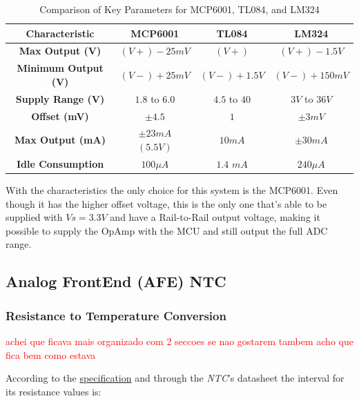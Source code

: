 \documentclass[12pt]{article}
\begin{document}
    \begin{table}[h]
        \centering
        \begin{tabular}{|c|c|c|c|}
        \hline
        \textbf{Characteristic}         & \textbf{MCP6001}      & \textbf{TL084}   & \textbf{LM324}  \\ \hline
        \textbf{Max Output (V)}         &$(V+)-25mV$            & $(V+)$           & $(V+) - 1.5V$   \\ \hline
        \textbf{Minimum Output (V)}     &$(V-)+25mV$            & $(V-) + 1.5V$   & $(V-) + 150mV$  \\ \hline
        \textbf{Supply Range (V)}       & $1.8$ to $6.0$        & $4.5$ to $40$    & $3V$ to $36V$   \\ \hline
        \textbf{Offset (mV)}            & $\pm 4.5$             & $1$              & $\pm 3 mV$      \\ \hline
        \textbf{Max Output (mA)}        & $\pm 23 mA$ $(5.5V)$  & $10 mA$          & $\pm 30 mA$     \\ \hline
        \textbf{Idle Consumption}       & $100 \mu A $          & $1.4$ $mA$       & $240 \mu A$      \\ \hline
        \end{tabular}
        \caption{Comparison of Key Parameters for MCP6001, TL084, and LM324}
    \end{table}

    With the characteristics the only choice for this system is the MCP6001. Even though it has the higher offset voltage, this is the only one that's able to be supplied with $Vs=3.3V$ and have a Rail-to-Rail output voltage, making it possible to supply the OpAmp with the MCU and still output the full ADC range.


\subsection{Analog FrontEnd (AFE) NTC}
\label{AFENTC}

    \subsubsection{ Resistance to Temperature Conversion }

    \textcolor{red}{ achei que ficava mais organizado com 2 seccoes se nao gostarem tambem acho que fica bem como estava }

    According to the \hyperref[requirements]{specification} and through the \textit{NTC}'s datasheet the interval for its resistance values is:
    
\end{document}
